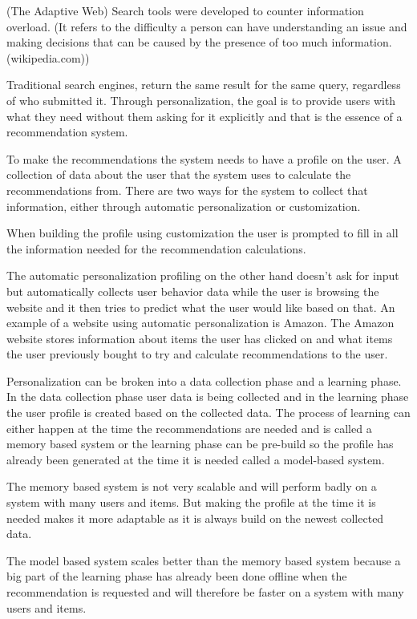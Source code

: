 (The Adaptive Web)
Search tools were developed to counter information overload. (It refers to the difficulty a person can have understanding an issue and making decisions that can be caused by the presence of too much information.(wikipedia.com))

Traditional search engines, return the same result for the same query, regardless of who submitted it. Through personalization, the goal is to provide users with what they need without them asking for it explicitly and that is the essence of a recommendation system.

To make the recommendations the system needs to have a profile on the user. A collection of data about the user that the system uses to calculate the recommendations from. There are two ways for the system to collect that information, either through automatic personalization or customization.

When building the profile using customization the user is prompted to fill in all the information needed for the recommendation calculations.

The automatic personalization profiling on the other hand doesn't ask for input but automatically collects user behavior data while the user is browsing the website and it then tries to predict what the user would like based on that. An example of a website using automatic personalization is Amazon. The Amazon website stores information about items the user has clicked on and what items the user previously bought to try and calculate recommendations to the user. 	
   
Personalization can be broken into a data collection phase and a learning phase. In the data collection phase user data is being collected and in the learning phase the user profile is created based on the collected data. The process of learning can either happen at the time the recommendations are needed and is called a memory based system or the learning phase can be pre-build so the profile has already been generated at the time it is needed called a model-based system.	

The memory based system is not very scalable and will perform badly on a system with many users and items. But making the profile at the time it is needed makes it more adaptable as it is always build on the newest collected data.

The model based system scales better than the memory based system because a big part of the learning phase has already been done offline when the recommendation is requested and will therefore be faster on a system with many users and items. 
